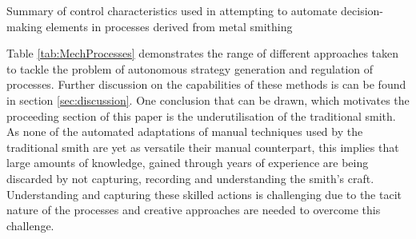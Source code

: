 \renewcommand{\arraystretch}{1.2} 
\begin{table}[h] 
    \centering
    \resizebox{\linewidth}{!}{
        
        }
    \caption{Summary of control characteristics used in attempting to automate decision-making elements  in processes derived from metal smithing}
    \label{tab:MechProcesses}
\end{table}

Table \ref{tab:MechProcesses} demonstrates the range of different approaches taken to tackle the problem of autonomous strategy generation and regulation of processes. Further discussion on the capabilities of these methods is can be found in section \ref{sec:discussion}. One conclusion that can be drawn, which motivates the proceeding section of this paper is the underutilisation  of the traditional smith. As none of the automated adaptations of manual techniques used by the traditional smith are yet as versatile their manual counterpart, this implies that large amounts of knowledge, gained through years of experience are being discarded by not capturing, recording and understanding the smith’s craft. Understanding and capturing these skilled actions is challenging due to the tacit nature of the processes and creative approaches are needed to overcome this challenge.





